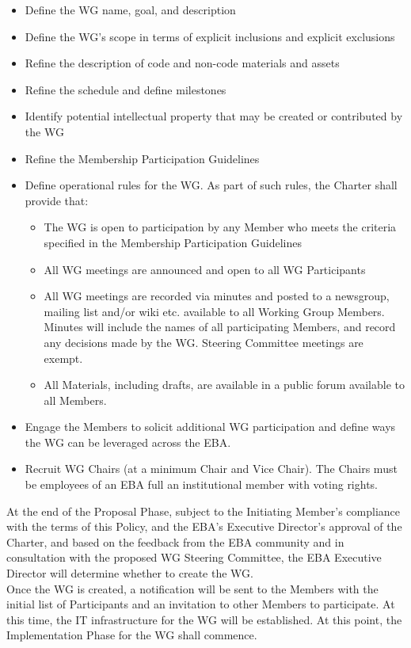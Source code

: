 \documentclass{article}
\begin{document}
\begin{itemize}
	\item Define the WG name, goal, and description
	\item Define the WG's scope in terms of explicit inclusions and explicit exclusions
	\item Refine the description of code and non-code materials and assets
	\item Refine the schedule and define milestones
	\item Identify potential intellectual property that may be created or contributed by the WG
	\item Refine the Membership Participation Guidelines
	\item Define operational rules for the WG. 
	As part of such rules, the Charter shall provide that:
	
	\begin{itemize}
		\item The WG is open to participation by any Member who meets the criteria specified in the Membership Participation Guidelines
		\item All WG meetings are announced and open to all WG Participants
		\item All WG meetings are recorded via minutes and posted to a newsgroup, mailing list and/or wiki etc. available to all Working Group Members. 
		Minutes will include the names of all participating Members, and record any decisions made by the WG. 
		Steering Committee meetings are exempt.
		\item All Materials, including drafts, are available in a public forum available to all Members.
	\end{itemize}
	
	\item Engage the Members to solicit additional WG participation and define ways the WG can be leveraged across the EBA.
	\item Recruit WG Chairs (at a minimum Chair and Vice Chair). 
	The Chairs must be employees of an EBA full an institutional member with voting rights.
	
\end{itemize}

At the end of the Proposal Phase, subject to the Initiating Member's compliance with the terms of this Policy, and the EBA’s Executive Director's approval of the Charter, and based on the feedback from the EBA community and in consultation with the proposed WG Steering Committee, the EBA Executive Director will determine whether to create the WG. \\
Once the WG is created, a notification will be sent to the Members with the initial list of Participants and an invitation to other Members to participate. 
At this time, the IT infrastructure for the WG will be established. 
At this point, the Implementation Phase for the WG shall commence.
\end{document}
